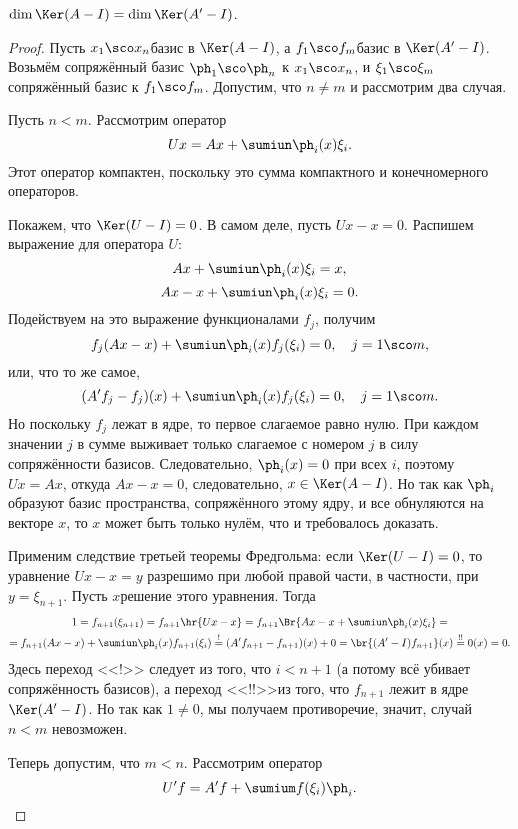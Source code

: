 \documentclass[a4paper]{article}
\begin{document}
\begin{theorem}
$\dim \Ker(A-I) = \dim \Ker(A'-I)$.
\end{theorem}
\begin{proof}
Пусть $x_1\sco x_n$\т базис в $\Ker(A - I)$, а $f_1\sco f_m$\т базис в $\Ker(A'-I)$.
Возьмём сопряжённый базис $\ph_1\sco\ph_n$ к $x_1\sco x_n$, и $\xi_1\sco \xi_m$\т сопряжённый базис
к $f_1\sco f_m$. Допустим, что $n \neq m$ и рассмотрим два случая.

 Пусть $n < m$. Рассмотрим оператор
$$Ux = Ax + \sumiun \ph_i(x)\xi_i.$$
Этот оператор компактен, поскольку это сумма компактного и конечномерного операторов.

Покажем, что $\Ker(U - I) = 0$. В самом деле, пусть $Ux - x = 0$.
Распишем выражение для оператора $U$:
$$Ax + \sumiun \ph_i(x)\xi_i = x,$$
$$Ax - x + \sumiun \ph_i(x)\xi_i = 0.$$
Подействуем на это выражение функционалами $f_j$, получим
$$f_j(Ax-x) + \sumiun \ph_i(x)f_j(\xi_i) = 0, \quad j =1\sco m,$$
или, что то же самое,
$$(A'f_j-f_j)(x) + \sumiun \ph_i(x)f_j(\xi_i) = 0, \quad j =1\sco m.$$
Но поскольку $f_j$ лежат в ядре, то первое слагаемое равно нулю. При каждом значении $j$ в сумме
выживает только слагаемое с номером $j$ в силу сопряжённости базисов.
Следовательно, $\ph_i(x) = 0$ при всех $i$, поэтому $Ux = Ax$, откуда $Ax - x = 0$, следовательно,
$x \in \Ker(A-I)$. Но так как $\ph_i$ образуют базис пространства, сопряжённого этому ядру, и все
обнуляются на векторе $x$, то $x$ может быть только нулём, что и требовалось доказать.

Применим следствие третьей теоремы Фредгольма: если $\Ker(U - I) = 0$, то уравнение
$Ux - x = y$ разрешимо при любой правой части, в частности, при $y = \xi_{n+1}$.
Пусть $x$\т решение этого уравнения. Тогда
\begin{multline*}
1 = f_{n+1}(\xi_{n+1}) = f_{n+1}\hr{U x - x} = f_{n+1}\Br{Ax - x + \sumiun \ph_i(x)\xi_i} =\\=
f_{n+1}(Ax-x) + \sumiun\ph_i(x)f_{n+1}(\xi_i) \stackrel{!}{=}
(A'f_{n+1} - f_{n+1})(x) + 0 = \br{(A'-I)f_{n+1}}(x) \stackrel{!!}{=} 0(x) = 0.
\end{multline*}
Здесь переход <<!>> следует из того, что $i < n+1$ (а потому всё убивает сопряжённость базисов),
а переход <<!!>>\т из того, что $f_{n+1}$ лежит в ядре $\Ker(A'-I)$.
Но так как $1 \neq 0$, мы получаем противоречие, значит, случай $n < m$ невозможен.

 Теперь допустим, что $m < n$. Рассмотрим оператор
$$U'f = A'f + \sumium f(\xi_i)\ph_i.$$


\end{proof}
\end{document}
